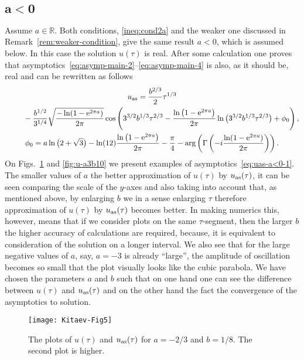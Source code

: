 \documentclass[pdftex]{sigma}
\numberwithin{equation}{section}
\begin{document}
\subsection[$a<0$]{$\boldsymbol{a<0}$}
Assume $a\in\mathbb R$. Both conditions, \eqref{ineq:cond2a} and the weaker one discussed in
Remark~\ref{rem:weaker-condition}, give the same result $a<0$, which is assumed below. In this
case the solution $u(\tau)$ is real. After some calculation one proves that
asymptotics~\eqref{eq:asymp-main-2}--\eqref{eq:asymp-main-4} is also, as it should be, real and
can be rewritten as follows
\begin{gather}
u_{\rm as}=\frac{b^{2/3}}{2}\tau^{1/3}\nonumber\\
\hphantom{u_{\rm as}=}{} -\frac{b^{1/2}}{3^{1/4}}\sqrt{\frac{-\ln(1-{\rm e}^{2\pi a})}{2\pi}}
\cos\left(3^{3/2}b^{1/3}\tau^{2/3}-\frac{\ln\big(1-{\rm e}^{2\pi a}\big)}{2\pi}\ln\big(3^{3/2}b^{1/3}\tau^{2/3}\big)
+\phi_0\right),\nonumber\\
\phi_0=a\ln\big(2+\sqrt{3}\big)-\ln(12)\frac{\ln\big(1-{\rm e}^{2\pi a}\big)}{2\pi}-\frac{\pi}{4}
-\arg\left(\Gamma\left(-i\frac{\ln(1-{\rm e}^{2\pi a})}{2\pi}\right)\right).\label{eq:uas-a<0-1}
\end{gather}
On Figs.~\ref{fig:u-a2d3b1d8} and \ref{fig:u-a3b10} we present examples of asymptotics~\eqref{eq:uas-a<0-1}.
The smaller values of $a$ the better approximation of $u(\tau)$ by $u_{\rm as}(\tau)$, it can be seen comparing
the scale of the $y$-axes and also taking into account that, as mentioned above, by enlarging $b$ we in a
sense enlarging $\tau$ therefore approximation of $u(\tau)$ by $u_{\rm as}(\tau)$ becomes better. In making
numerics this, however, means that if we consider plots on the same $\tau$-segment, then the larger $b$
the higher accuracy of calculations are required, because, it is equivalent to consideration of the solution
on a longer interval. We also see that for the large negative values of $a$, say, $a=-3$ is already ``large'', the amplitude of oscillation
becomes so small that the plot visually looks like the cubic parabola.
We have chosen the parameters $a$ and $b$ such that on one hand one can see the difference between
$u(\tau)$ and $u_{\rm as}(\tau)$ and on the other hand the fact the convergence of the asymptotics to solution.
\begin{figure}[h!]\centering
\texttt{[image: Kitaev-Fig5]}
\caption{The plots of $u(\tau)$ and $u_{\rm as}(\tau)$ for $a=-2/3$ and $b=1/8$. The second plot is higher.}\label{fig:u-a2d3b1d8}
\end{figure}
\end{document}
